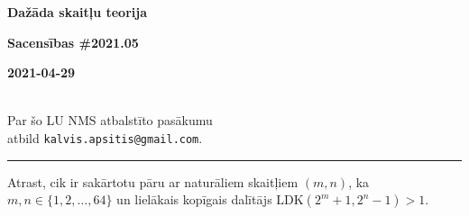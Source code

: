 \documentclass[a4paper,12pt]{article}
\newcommand\answer[1]{}
\begin{document}
\begin{center}
\parbox{3.5cm}{\flushleft\bf Dažāda skaitļu teorija} \hfill {\bf\LARGE Sacensības \#2021.05} \hfill \parbox{3.5cm}{\flushright\bf 2021-04-29} \\[2pt]
{\rm\footnotesize Par šo LU NMS atbalstīto pasākumu\\ atbild {\tt kalvis.apsitis@gmail.com}.}
\end{center}

\hrule

\vspace{10pt}
\begin{problem}
Atrast, cik ir sakārtotu pāru ar naturāliem skaitļiem $(m,n)$,
ka $m,n \in \{ 1,2,\ldots,64 \}$ un lielākais kopīgais 
dalītājs $\text{LDK}(2^m + 1, 2^n - 1) > 1$. 
\answer{

{\bf Atbilde.} $\mathtt{1365}$

Visiem nepāra $m$, $2^m + 1$ dalās ar $3$. Tāpēc veido derīgu pāri ar jebkuru pāra skaitli $n$ (kam savukārt $2^n - 1$ dalās ar $3$). 
Šādu pāru ir pavisam $32 \cdot 32 = 1024$. 

Visiem pāra $m$ (kas nedalās ar $4$), $2^m + 1$ dalās ar $5$. Tie veido derīgu pāri ar jebkuru $n$, kas dalās ar $4$. 
Šādu pāru ir pavisam $16 \cdot 16 = 256$. 

Visiem pāra $m$ (kas dalās ar $4$, bet nedalās ar $8$), $2^m + 1$ dalās ar $17$. Tie veido derīgu pāri ar jebkuru $n$, kas dalās ar $4$. 
Šādu pāru ir pavisam $8 \cdot 8 = 64$. Utt. 

Visbeidzot $m = 32$ veido pāri tikai ar $n = 64$ (var pārbaudīt dalāmību, izmantojot kvadrātu starpības formulu).

\[ 32 \cdot 32 + 16 \cdot 16 + 8 \cdot 8 + 4 \cdot 4 + 2 \cdot 2 + 1 \cdot 1 = 1365. \]

}
\end{problem}
\end{document}
